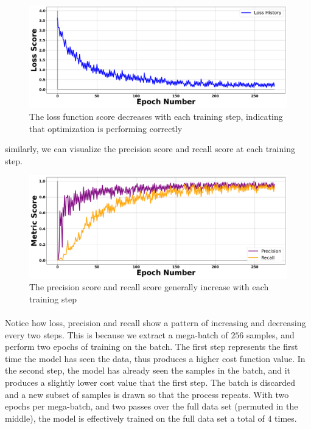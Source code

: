 \documentclass[12pt,letterpaper]{article}
\begin{document}
\begin{figure}[H]
\begin{center}
\includegraphics[scale=0.3]{../Figures/LossHistory}
\end{center}
\caption{The loss function score decreases with each training step, indicating that optimization is performing correctly}
\label{fig-LossScore}
\end{figure}

similarly, we can visualize the precision score and recall score at each training step.

\begin{figure}[H]
\begin{center}
\includegraphics[scale=0.3]{../Figures/MetricHistory}
\end{center}
\caption{The precision score and recall score generally increase with each training step}
\label{fig-PrecisionRecallScores}
\end{figure}

\paragraph*{}Notice how loss, precision and recall show a pattern of increasing and decreasing every two steps. This is because we extract a mega-batch of $256$ samples, and perform two epochs of training on the batch. The first step represents the first time the model has seen the data, thus produces a higher cost function value. In the second step, the model has already seen the samples in the batch, and it produces a slightly lower cost value that the first step. The batch is discarded and a new subset of samples is drawn so that the process repeats. With two epochs per mega-batch, and two passes over the full data set (permuted in the middle), the model is effectively trained on the full data set a total of $4$ times.
\end{document}
